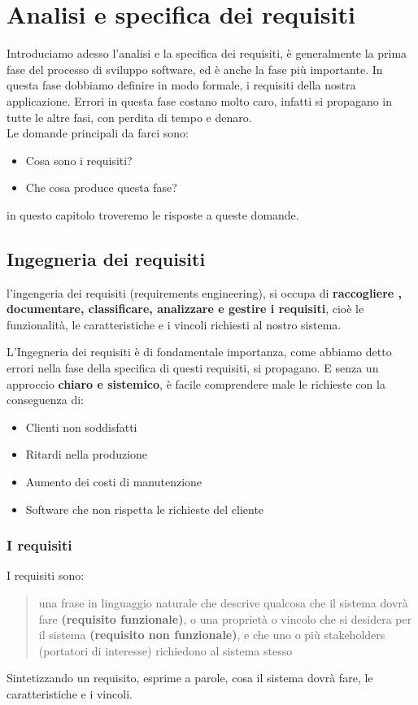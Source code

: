 \section{Analisi e specifica dei requisiti}
Introduciamo adesso l'analisi e la specifica dei requisiti,
\`e generalmente la prima fase del processo di sviluppo software,
ed \`e anche la fase pi\`u importante.
In questa fase dobbiamo definire in modo formale, i requisiti della nostra applicazione.
Errori in questa fase costano molto caro, infatti si propagano in tutte le altre fasi,
con perdita di tempo e denaro.
\\
Le domande principali da farci sono:
\begin{itemize}
    \item Cosa sono i requisiti?
    \item Che cosa produce questa fase?
\end{itemize}
in questo capitolo troveremo le risposte a queste domande.
\subsection{Ingegneria dei requisiti}
l'ingengeria dei requisiti (requirements engineering), si occupa di \textbf{raccogliere
, documentare, classificare, analizzare e gestire i requisiti}, cio\`e le funzionalit\`a, le 
caratteristiche e i vincoli richiesti al nostro sistema.

L'Ingegneria dei requisiti \`e di fondamentale importanza, come abbiamo detto errori
nella fase della specifica di questi requisiti, si propagano.
E senza un approccio \textbf{chiaro e sistemico}, \`e facile comprendere male 
le richieste con la conseguenza di:
\begin{itemize}
    \item Clienti non soddisfatti
    \item Ritardi nella produzione
    \item Aumento dei costi di manutenzione
    \item Software che non rispetta le richieste del cliente
\end{itemize}
\subsubsection{I requisiti}
I requisiti sono:
\begin{quote}
    una frase in linguaggio naturale che descrive qualcosa che il sistema dovr\`a
    fare \textbf{(requisito funzionale)}, o una propriet\`a o vincolo che si desidera per il sistema
    \textbf{(requisito non funzionale)}, e che uno o pi\`u stakeholders (portatori di interesse) 
    richiedono al sistema stesso
\end{quote}
Sintetizzando un requisito, esprime a parole, cosa il sistema dovr\`a fare, le caratteristiche e i vincoli.
